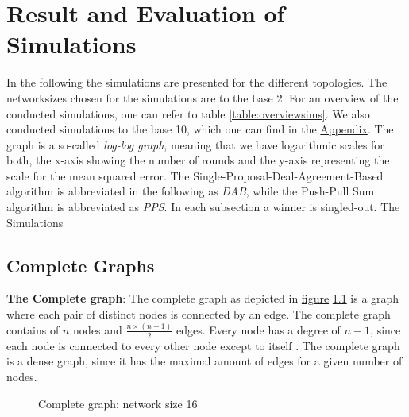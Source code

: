 \chapter{Result and Evaluation of Simulations}\label{chap:results}
In the following the simulations are presented for the different topologies. The networksizes chosen for the simulations are to the base 2. For an overview of the conducted simulations, one can refer to table \ref{table:overviewsims}. We also conducted simulations to the base 10, which one can find in the \hyperref[chap:appendix]{Appendix}.
The graph is a so-called \textit{log-log graph}, meaning that we have logarithmic scales for both, the x-axis showing the number of rounds and the y-axis representing the scale for the mean squared error. The Single-Proposal-Deal-Agreement-Based algorithm is abbreviated in the following as \textit{DAB}, while the Push-Pull Sum algorithm is abbreviated as \textit{PPS}. In each subsection a winner is singled-out. The Simulations

\section{Complete Graphs}
\textbf{The Complete graph}: The complete graph as depicted in \hyperref[fig:completegraphDemo]{figure} \ref{fig:completegraphDemo} is a graph where each pair of distinct nodes is connected by an edge. The complete graph contains of $n$ nodes and $\frac{n\times(n-1)}{2}$ edges. Every node has a degree of $n-1$, since each node is connected to every other node except to itself \cite{GraphTheorySchindelhaauer2021}. The complete graph is a dense graph, since it has the maximal amount of edges for a given number of nodes.
\begin{figure}[H]
    \centering
    
    \caption{Complete graph: network size 16}
    \label{fig:completegraphDemo}
\end{figure}
